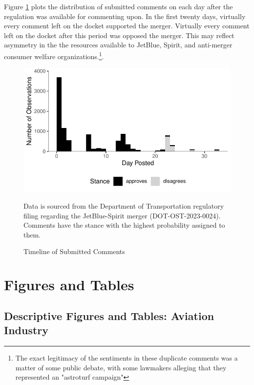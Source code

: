 \documentclass{article}
\begin{document}
\begin{appendices}
Figure \ref{fig:CommentTimeline} plots the distribution of submitted comments on each day after the regulation was available for commenting upon. In the first twenty days, virtually every comment left on the docket supported the merger. Virtually every comment left on the docket after this period was opposed the merger. This may reflect asymmetry in the the resources available to JetBlue, Spirit, and anti-merger consumer welfare organizations.\footnote{The exact legitimacy of the sentiments in these duplicate comments was a matter of some public debate, with some lawmakers alleging that they represented an "astroturf campaign"\citep{birnbaum_elizabeth_2023}}.  

    \begin{figure}[h]
		\caption{Timeline of Submitted Comments}
		\label{fig:CommentTimeline}
		\includegraphics{stance_submission_timeline}
		\begin{minipage}{\textwidth} 
			{\footnotesize Data is sourced from the Department of Transportation regulatory filing regarding the JetBlue-Spirit merger  (DOT-OST-2023-0024). Comments have the stance with the highest probability assigned to them.} 
		\end{minipage}
	\end{figure}
	
	
	

	\FloatBarrier
	\pagebreak
	\section{Figures and Tables}	
	
	\subsection{Descriptive Figures and Tables: Aviation Industry}
	

\end{appendices}
\end{document}
